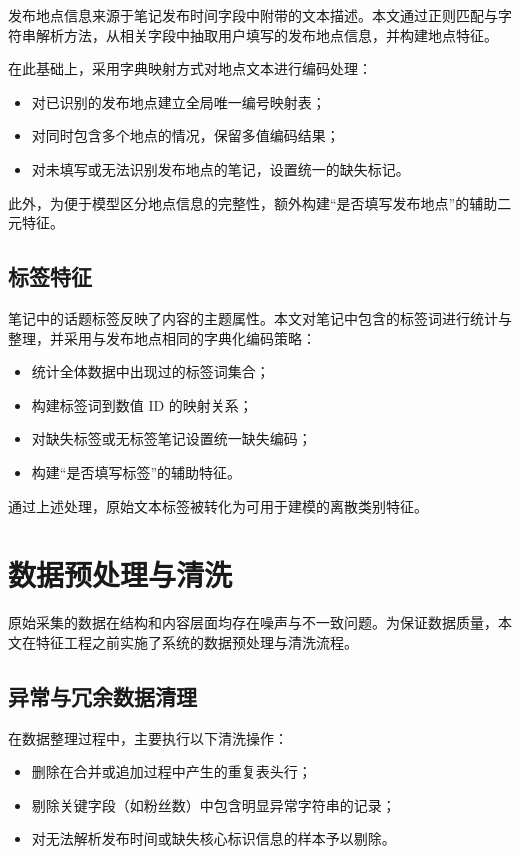 发布地点信息来源于笔记发布时间字段中附带的文本描述。本文通过正则匹配与字符串解析方法，从相关字段中抽取用户填写的发布地点信息，并构建地点特征。

在此基础上，采用字典映射方式对地点文本进行编码处理：

\begin{itemize}
\item 对已识别的发布地点建立全局唯一编号映射表；
\item 对同时包含多个地点的情况，保留多值编码结果；
\item 对未填写或无法识别发布地点的笔记，设置统一的缺失标记。
\end{itemize}

此外，为便于模型区分地点信息的完整性，额外构建“是否填写发布地点”的辅助二元特征。

\subsection{标签特征}

笔记中的话题标签反映了内容的主题属性。本文对笔记中包含的标签词进行统计与整理，并采用与发布地点相同的字典化编码策略：

\begin{itemize}
\item 统计全体数据中出现过的标签词集合；
\item 构建标签词到数值 ID 的映射关系；
\item 对缺失标签或无标签笔记设置统一缺失编码；
\item 构建“是否填写标签”的辅助特征。
\end{itemize}

通过上述处理，原始文本标签被转化为可用于建模的离散类别特征。

\section{数据预处理与清洗}

原始采集的数据在结构和内容层面均存在噪声与不一致问题。为保证数据质量，本文在特征工程之前实施了系统的数据预处理与清洗流程。

\subsection{异常与冗余数据清理}

在数据整理过程中，主要执行以下清洗操作：

\begin{itemize}
\item 删除在合并或追加过程中产生的重复表头行；
\item 剔除关键字段（如粉丝数）中包含明显异常字符串的记录；
\item 对无法解析发布时间或缺失核心标识信息的样本予以剔除。
\end{itemize}

